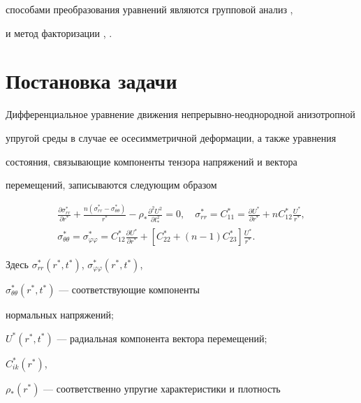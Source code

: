 способами преобразования уравнений являются групповой анализ \cite{2}, 


\cite{9} и метод факторизации \cite{10}, \cite{11}. 


 


\section{Постановка задачи} 


 


Дифференциальное уравнение движения непрерывно-неоднородной анизотропной 


упругой среды в случае ее осесимметричной деформации, а также уравнения 


состояния, связывающие компоненты тензора напряжений и вектора 


перемещений, записываются следующим образом \cite{12} 


\begin{gather} 


\frac{\partial\sigma^*_{rr}}{\partial r^*}+ 


\frac{n(\sigma^*_{rr}-\sigma^*_{\theta\theta})}{r^*}- 


\rho_*\frac{\partial^2U^2}{\partial t^2_*}=0,\quad 


\sigma^*_{rr}=C^*_{11}= 


\frac{\partial U^*}{\partial r^*}+n C^*_{12} 


\frac{U^*}{r^*}, \\ 


\sigma^*_{\theta\theta}=\sigma^*_{\varphi\varphi}= 


C^*_{12}\frac{\partial U^*}{\partial r^*}+[C^*_{22}+ 


(n-1)C^*_{23}]\frac{U^*}{r^*}. 


\end{gather} 


Здесь $\sigma^*_{rr}(r^*,t^*)$, $\sigma^*_{\varphi\varphi}(r^*,t^*)$, 


$\sigma^*_{\theta\theta}(r^*,t^*)$ --- соответствующие компоненты 


нормальных напряжений; 


$U^*(r^*,t^*)$ --- радиальная компонента вектора перемещений; 


$C^*_{ik}(r^*)$, 


$\rho_*(r^*)$ --- соответственно упругие характеристики и плотность 


